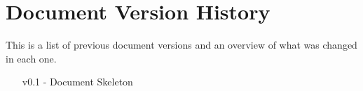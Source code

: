 
\section{Document Version History}
This is a list of previous document versions and an overview of what was changed in each one.
\begin{itemize}[leftmargin=5em]
    \item [v0.1 -] Document Skeleton
\end{itemize}

\newpage